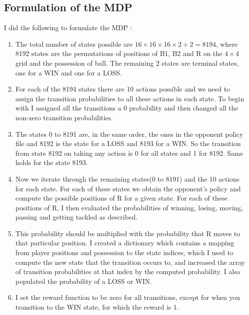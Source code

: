 \documentclass[11pt]{article}
\begin{document}
\subsection*{Formulation of the MDP}
I did the following to formulate the MDP :
\begin{enumerate}
    \item The total number of states possible are $16 \times 16 \times 16 \times 2 + 2 = 8194$, where
    8192 states are the permutations of positions of B1, B2 and R on the $4\times4$ grid and the possession of ball. The remaining 
    2 states are terminal states, one for a WIN and one for a LOSS. 
    \item For each of the 8194 states there are 10 actions possible and we need to assign the transition probabilities to all these actions in each state. To begin with I assigned all the transitions a 0 probability and then changed all the non-zero transition probabilities.
    \item The states 0 to 8191 are, in the same order, the ones in the opponent policy file and 8192 is the state for a LOSS and 8193 for a WIN. So
    the transition from state 8192 on taking any action is 0 for all states and 1 for 8192. Same holds for the state 8193.
    \item Now we iterate through the remaining states(0 to 8191) and the 10 actions for each state. For each of these states we obtain the opponent's policy
    and compute the possible positions of R for a given state. For each of these positions of R, I then evaluated the probabilities
    of winning, losing, moving, passing and getting tackled as described. 
    \item This probability should be multiplied with the probability that R moves to that particular position. I created a dictionary which contains a mapping from player positions and possession to the state indices, which I used
    to compute the new state that the transition occurs to, and increased the array of transition probabilities at that index by the computed probability. I also populated the probability of a LOSS or WIN. 
    \item I set the reward function to be zero for all transitions, except for when you transition to the WIN state, for which the reward is 1.
\end{enumerate}
\end{document}
